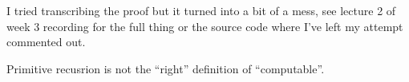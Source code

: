 \documentclass{article}
\begin{document}
\begin{theorem}

        
        
        
    
    I tried transcribing the proof but it turned into a bit of a mess,
    see lecture 2 of week 3 recording for the full thing or the source code
    where I've left my attempt commented out.
\end{theorem}
\begin{remark}
    Primitive recusrion is not the ``right'' definition of ``computable''.
\end{remark}
\end{document}
